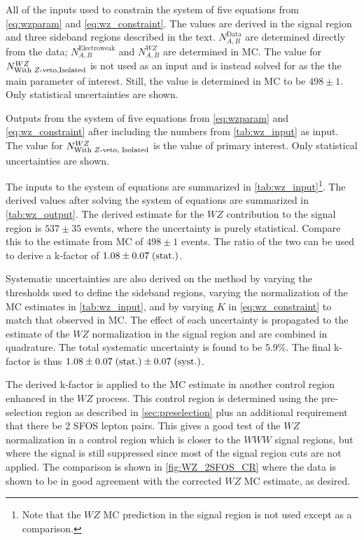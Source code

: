 \begin{table}
\centering

\caption{All of the inputs used to constrain the system of five equations
from \eqn\eqref{eq:wzparam} and \eqn\eqref{eq:wz_constraint}.
The values are derived in the signal region and three sideband regions
described in the text. $N^{\textrm{Data}}_{A,B}$ are determined directly
from the data; $N^{\textrm{Electroweak}}_{A,B}$ and $N^{WZ}_{A,B}$ are 
determined in MC. The value for $N^{WZ}_{\textrm{With \z-veto,Isolated}}$ is
not used as an input and is instead solved for as the the main
parameter of interest. Still, the value is determined in MC to be
$498 \pm 1$.  Only statistical uncertainties are shown.}
\label{tab:wz_input}
\end{table}

\begin{table}
\centering

\caption{Outputs from the system of five equations
from \eqn\eqref{eq:wzparam} and \eqn\eqref{eq:wz_constraint}
after including the numbers from \tab\ref{tab:wz_input} as input.
The value for $N^{WZ}_{\textrm{With \z-veto, Isolated}}$ is 
the value of primary interest.  Only statistical uncertainties are shown.}
\label{tab:wz_output}
\end{table}


The inputs to the system of equations are summarized in 
\tab\ref{tab:wz_input}\footnote{Note that the $WZ$ MC prediction in 
the signal region is not used except as a comparison.}.
The derived values after solving the system of equations are
summarized in \tab\ref{tab:wz_output}. 
The derived estimate for the $WZ$ contribution to 
the signal region is 
$537 \pm 35$
events, where the uncertainty is purely statistical. 
Compare this to the estimate from MC of 
$498 \pm 1$ events.
The ratio of the two can be used to derive a k-factor of
$1.08\pm0.07\mbox{$\;$(stat.)}$.


Systematic uncertainties are also derived on the method
by varying the 
thresholds used to define the sideband regions, varying the normalization
of the MC estimates in \tab\ref{tab:wz_input}, and by varying $K$ 
in \eqn\eqref{eq:wz_constraint} to match that observed in MC. The effect of each
uncertainty is propagated to the estimate of the $WZ$ normalization in
the signal region and are combined in quadrature. The total systematic
uncertainty is found to be 5.9\%. 
The final k-factor is thus $1.08 \pm0.07\mbox{$\;$(stat.)}\pm0.07\mbox{$\;$(syst.)}$.

The derived k-factor is applied to the MC estimate in another control
region enhanced in the $WZ$ process. This control region is determined
using the pre-selection region as described in \sec\ref{sec:preselection}
plus an additional requirement that there be 2 SFOS lepton pairs.
This gives a good test of the $WZ$ normalization in a control region
which is closer to the $WWW$ signal regions, but where the signal is still
suppressed since most of the signal region cuts are not applied.
The comparison is shown in \fig\ref{fig:WZ_2SFOS_CR} where
the data is shown to be in good agreement with the corrected $WZ$ MC
estimate, as desired.

